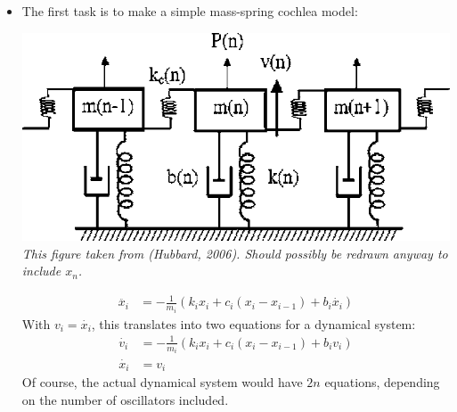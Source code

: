 

\begin{itemize}
\item The first task is to make a simple mass-spring cochlea model:
	\begin{center}
		\includegraphics[width=0.4\linewidth]{mass-spring} \\
		\textit{\footnotesize This figure taken from (Hubbard, 2006). Should possibly be redrawn anyway to include $x_n$.}
	\end{center}
\begin{align*}
	\ddot{x_i} &= - \frac{1}{m_i} \left( k_i x_i + c_i (x_i-x_{i-1}) + b_i \dot{x_i} \right)
\end{align*}
With $v_i=\dot{x_i}$, this translates into two equations for a dynamical system:
\begin{align*}
	\dot{v_i} &= - \frac{1}{m_i} \left( k_i x_i + c_i (x_i-x_{i-1}) + b_i v_i \right) \\
	\dot{x_i} &= v_i
\end{align*}
Of course, the actual dynamical system would have $2n$ equations, depending on the number
of oscillators included.
\end{itemize}


